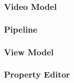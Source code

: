 \documentclass[t]{beamer}
\begin{document}
\begin{frame}
\frametitle{Video Model}
\end{frame}
\begin{frame}
\frametitle{Pipeline}
\end{frame}
\begin{frame}
\frametitle{View Model}
\end{frame}
\begin{frame}
\frametitle{Property Editor}
\end{frame}
\end{document}
